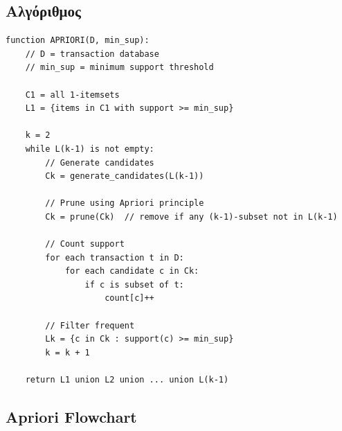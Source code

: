 \subsection{Αλγόριθμος}

\begin{algorithmbox}
\begin{lstlisting}[language=pseudo]
function APRIORI(D, min_sup):
    // D = transaction database
    // min_sup = minimum support threshold

    C1 = all 1-itemsets
    L1 = {items in C1 with support >= min_sup}

    k = 2
    while L(k-1) is not empty:
        // Generate candidates
        Ck = generate_candidates(L(k-1))

        // Prune using Apriori principle
        Ck = prune(Ck)  // remove if any (k-1)-subset not in L(k-1)

        // Count support
        for each transaction t in D:
            for each candidate c in Ck:
                if c is subset of t:
                    count[c]++

        // Filter frequent
        Lk = {c in Ck : support(c) >= min_sup}
        k = k + 1

    return L1 union L2 union ... union L(k-1)
\end{lstlisting}
\end{algorithmbox}

\subsection{Apriori Flowchart}

